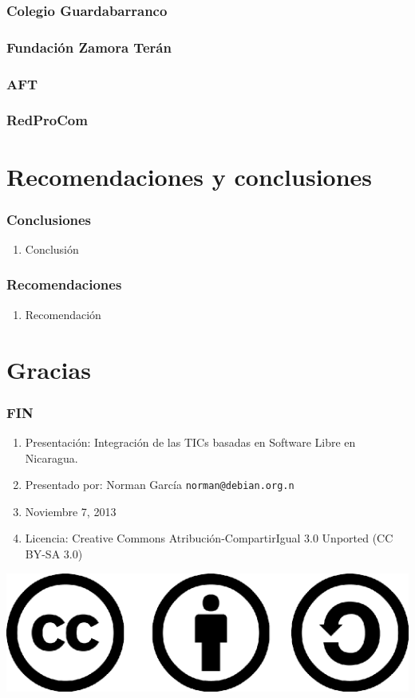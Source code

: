 \documentclass{beamer}
\begin{document}
\begin{frame}
\frametitle{Colegio Guardabarranco}
\end{frame}

\begin{frame}
\frametitle{Fundaci\'on Zamora Ter\'an}
\end{frame}

\begin{frame}
\frametitle{AFT}
\end{frame}

\begin{frame}
\frametitle{RedProCom}
\end{frame}

\section {Recomendaciones y conclusiones}
\begin{frame}
\frametitle{Conclusiones}
	\begin{enumerate}	
		\pause \item Conclusi\'on
	\end{enumerate}
\end{frame}


\begin{frame} 
\frametitle{Recomendaciones}
	\begin{enumerate}
		\pause \item Recomendaci\'on
	\end{enumerate}
\end{frame}


\section{Gracias}


\begin{frame}
\frametitle{FIN}
	\begin{enumerate}
		\pause \item Presentaci\'on: Integración de las TICs basadas en Software Libre en Nicaragua.
		\pause \item Presentado por: Norman Garc\'ia  \texttt{norman@debian.org.n}
		\pause \item Noviembre 7, 2013
		\pause \item Licencia: Creative Commons Atribuci\'on-CompartirIgual 3.0 Unported (CC BY-SA 3.0)
	\end{enumerate}

	\begin{center}
  		 \includegraphics[scale=0.20]{../img/cclogo.png}
	\end{center}

\end{frame}
\end{document}
